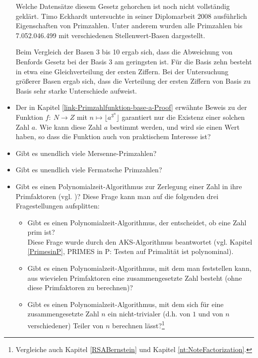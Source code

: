 \begin{refsegment}
\begin{itemize}
     Welche Datensätze diesem Gesetz gehorchen ist noch nicht vollständig
     geklärt. Timo Eckhardt untersuchte in seiner Diplomarbeit 2008 ausführlich
     Eigenschaften von Primzahlen. Unter anderem wurden alle Primzahlen bis
     7.052.046.499 mit verschiedenen Stellenwert-Basen dargestellt.

     Beim Vergleich der Basen 3 bis 10 ergab sich, dass die Abweichung von
     Benfords Gesetz bei der Basis 3 am geringsten ist. Für die Basis zehn
     besteht in etwa eine Gleichverteilung der ersten Ziffern. Bei der
     Untersuchung größerer Basen ergab sich, dass die Verteilung der ersten
     Ziffern von Basis zu Basis sehr starke Unterschiede aufweist.



\item %
      \label{link-Primzahlfunktion-base-a-Offen}
    Der in Kapitel \ref{link-Primzahlfunktion-base-a-Proof} erwähnte Beweis zu
    der Funktion  $f: \: N \rightarrow Z$ mit $n \mapsto \lfloor a^{3^n}\rfloor$
    garantiert nur die Existenz einer
    solchen Zahl $a$.  Wie kann diese Zahl $a$ bestimmt werden, und wird sie
    einen Wert haben, so dass die Funktion auch von praktischem Interesse ist?


\item Gibt es unendlich viele Mersenne-Primzahlen?

\item Gibt es unendlich viele Fermatsche Primzahlen?


\item Gibt es einen Polynomialzeit-Algorithmus zur
   Zerlegung einer Zahl in ihre Primfaktoren (vgl. \cite[S. 167]{Klee1997})?
   Diese Frage kann man auf die folgenden drei Fragestellungen aufsplitten:
   \begin{itemize}
        \item Gibt es einen Polynomialzeit-Algorithmus, der entscheidet, ob
	   eine Zahl prim ist? \\
	   Diese Frage wurde durch den AKS-Algorithmus
	   beantwortet (vgl.  Kapitel \ref{PrimesinP}, \glqq PRIMES in P\grqq:
	   Testen auf Primalität ist polynominal).
        \item Gibt es einen Polynomialzeit-Algorithmus, mit dem man
           feststellen kann, aus wievielen Primfaktoren eine zusammengesetzte
           Zahl besteht (ohne diese Primfaktoren zu berechnen)?
        \item Gibt es einen Polynomialzeit-Algorithmus, mit dem sich für
	   eine zusammengesetzte Zahl $n$ ein nicht-trivialer (d.h.
	   von $1$ und von $n$ verschiedener) Teiler von $n$ berechnen
	   lässt?\footnote{Vergleiche auch Kapitel \ref{RSABernstein}
	   und Kapitel \ref{nt:NoteFactorization}.}
   \end{itemize}


\end{itemize}
\end{refsegment}
